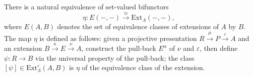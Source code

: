 There is a natural equivalence of set-valued bifunctors
$$\eta : E(-, -) \xrightarrow{\cong} \text{Ext}_\Lambda(-, -),$$
where $E(A, B)$ denotes the set of equivalence classes of extensions of $A$ by $B$. The map $\eta$ is defined as follows: given a projective presentation $R \xrightarrow{\mu} P \xrightarrow{\varepsilon} A$ and an extension $B \xrightarrow{\kappa} E \xrightarrow{\nu} A$, construct the pull-back $E^\alpha$ of $\nu$ and $\varepsilon$, then define $\psi : R \to B$ via the universal property of the pull-back; the class $[\psi] \in \text{Ext}_\Lambda^\varepsilon(A, B)$ is $\eta$ of the equivalence class of the extension.
